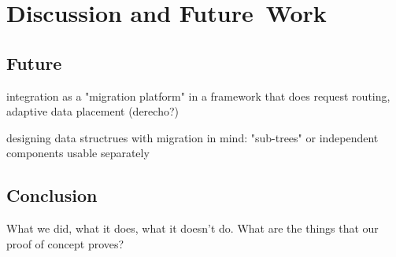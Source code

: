 \chapter{Discussion and Future~Work}
\label{chap:discussionfuture}


\section{Future}

integration as a "migration platform" in a framework that does request routing,
adaptive data placement (derecho?)

designing data structrues with migration in mind: "sub-trees" or independent
components usable separately


\section{Conclusion}
What we did, what it does, \cite{kalia2016fasst} what it doesn't do. What are the things that our
proof of concept proves?

